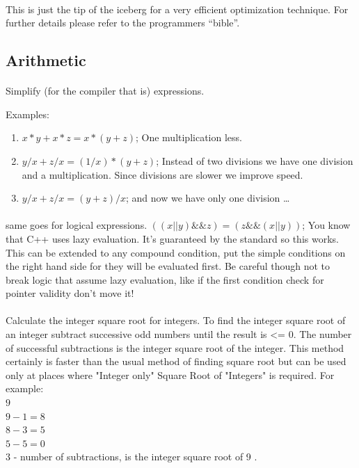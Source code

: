 \documentclass{article}
\begin{document}
 \paragraph{}
 This is just the tip of the iceberg for a very efficient optimization technique.  For further details please refer to the programmers ``bible''\cite{6}.
 

 
 \subsection{Arithmetic}
 
 \paragraph{}
 Simplify (for the compiler that is) expressions.
 
 Examples:\\
 
 \begin{enumerate}
 \item $ x*y + x*z = x*(y+z)$;  One multiplication less.
 \item $ y/x + z/x = (1/x)*(y+z)$;  Instead of two divisions we have one  division and a multiplication. Since divisions are slower we improve speed.
 \item $ y/x + z/x = (y+z)/x$; and now we have only one division \ldots
 \end{enumerate}

 \paragraph{}
 same goes for logical expressions.
         $ ((x || y ) \&\&  z ) = (z  \&\& ( x || y ))$;  You know that  C++ uses lazy evaluation. It's guaranteed by the standard so this works.
 This can be extended to any compound condition, put the simple conditions on the right hand side for they will be evaluated first.
 Be careful though not to break logic that assume lazy evaluation, like if the first condition check for pointer validity don't move it!

 \paragraph{}
 Calculate the integer square root for integers. 
  To find the integer square root of an integer subtract successive odd numbers until the result is <= 0.
  The number of successful subtractions is the integer square root of the integer.
  This method certainly is faster than the usual method of finding square root but can be used only at places where "Integer only" Square Root of "Integers" is required. For example:\\
  $9$\\
   $9 - 1 = 8$\\
           $8 - 3 = 5$\\
   $5 - 5 = 0$\\
          $3$ - number of subtractions, is the integer square root of 9 .
 
\end{document}
